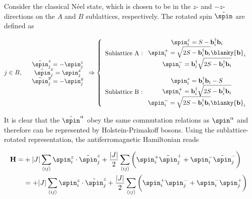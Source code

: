 Consider the classical Néel state, which is chosen to be in the $z$- and $-z$-directions on the $A$ and $B$ sublattices, respectively. The rotated spin $\tilde{\spin}$ are defined as 

\begin{equation}
    j \in B, \quad \begin{array}{c}
         \tilde{\spin}_j^z = - \spin_j^z  \\
         \tilde{\spin}_j^x = \spin_j^x \\
         \tilde{\spin}_j^y = - \spin_j^y 
    \end{array} \Rightarrow \left\{ \begin{array}{cc}
         \textnormal{Sublattice A : } \begin{array}{cc}
              \spin^z_i = S - {\bf b}_i^\dagger {\bf b}_i  \\
              \spin^+_i = \sqrt{2S - {\bf b}_i^\dagger {\bf b}_i} \blanky {\bf b}_i \\
              \spin^-_i = {\bf b}_i^\dagger\sqrt{2S - {\bf b}_i^\dagger {\bf b}_i} 
         \end{array}\\
         \\
         \textnormal{Sublattice B : }  \begin{array}{cc}
              \spin^z_i = {\bf b}_i^\dagger {\bf b}_i - S  \\
              \spin^+_i = {\bf b}_i^\dagger\sqrt{2S - {\bf b}_i^\dagger {\bf b}_i} \\
              \spin^-_i = \sqrt{2S - {\bf b}_i^\dagger {\bf b}_i} \blanky {\bf b}_i 
         \end{array}
    \end{array} \right.
\end{equation}

It is clear that the $\tilde{\spin}^\alpha$ obey the same commutation relations as $\spin^\alpha$ and therefore can be represented by Holstein-Primakoff bosons. Using the sublattice-rotated representation, the antiferromagnetic Hamiltonian reads

\begin{equation}
\begin{split}
    {\bf H} =& + |J| \sum_{\langle ij \rangle} \spin_i^z \cdot \tilde{\spin}_j^z + \frac{|J|}{2} \sum_{\langle ij \rangle} \bigg( \spin_i^+ \tilde{\spin}_j^+ + \spin_i^- \tilde{\spin}_j^- \bigg) \\
    &= + |J| \sum_{\langle ij \rangle} \spin_i^z \cdot \tilde{\spin}_j^z + \frac{|J|}{2} \sum_{\langle ij \rangle} \bigg( \spin_i^+ {\spin}_j^- + \spin_i^- {\spin}_j^+ \bigg) 
\end{split}
\end{equation}

